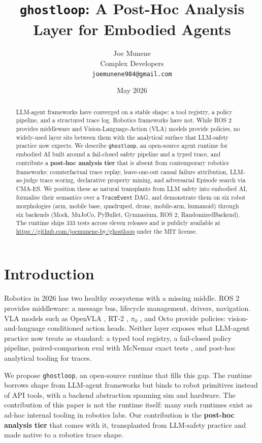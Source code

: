 \documentclass[11pt]{article}
\title{\texttt{ghostloop}: A Post-Hoc Analysis Layer for Embodied Agents}
\author{
  Joe Munene \\
  Complex Developers \\
  \texttt{joemunene984@gmail.com}
}
\date{May 2026}
\begin{document}
\maketitle

\begin{abstract}
LLM-agent frameworks have converged on a stable shape: a tool registry,
a policy pipeline, and a structured trace log. Robotics frameworks have
not. While ROS 2 provides middleware and Vision-Language-Action (VLA)
models provide policies, no widely-used layer sits between them with
the analytical surface that LLM-safety practice now expects. We
describe \texttt{ghostloop}, an open-source agent runtime for
embodied AI built around a fail-closed safety pipeline and a typed
trace, and contribute a \textbf{post-hoc analysis tier} that is
absent from contemporary robotics frameworks: counterfactual trace
replay, leave-one-out causal failure attribution, LLM-as-judge
trace scoring, declarative property mining, and adversarial Episode
search via CMA-ES. We position these as natural transplants from
LLM safety into embodied AI, formalise their semantics over a
\texttt{TraceEvent} DAG, and demonstrate them on six robot
morphologies (arm, mobile base, quadruped, drone, mobile-arm,
humanoid) through six backends (Mock, MuJoCo, PyBullet, Gymnasium,
ROS 2, RandomizedBackend). The runtime ships 333 tests across
eleven releases and is publicly available at
\url{https://github.com/joemunene-by/ghostloop} under the MIT
license.
\end{abstract}

\section{Introduction}

Robotics in 2026 has two healthy ecosystems with a missing middle.
ROS 2 \citep{macenski2022ros2} provides middleware: a message bus,
lifecycle management, drivers, navigation. VLA models such as
OpenVLA \citep{kim2024openvla}, RT-2 \citep{brohan2023rt2}, $\pi_0$
\citep{black2024pi0}, and Octo \citep{octo2024} provide policies:
vision-and-language conditioned action heads. Neither layer exposes
what LLM-agent practice now treats as standard: a typed tool
registry, a fail-closed policy pipeline, paired-comparison eval with
McNemar exact tests \citep{mcnemar1947note}, and post-hoc analytical
tooling for traces.

We propose \texttt{ghostloop}, an open-source runtime that fills this
gap. The runtime borrows shape from LLM-agent frameworks but binds
to robot primitives instead of API tools, with a backend abstraction
spanning sim and hardware. The contribution of this paper is not the
runtime itself: many such runtimes exist as ad-hoc internal tooling
in robotics labs. Our contribution is the \textbf{post-hoc analysis
tier} that comes with it, transplanted from LLM-safety practice and
made native to a robotics trace shape.
\end{document}
